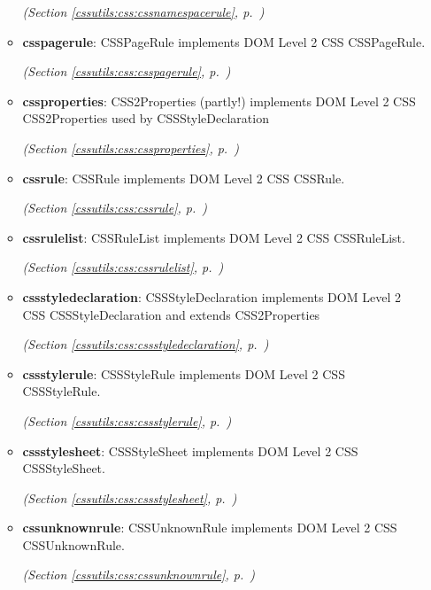 \begin{itemize}
\begin{itemize}
  \textit{(Section \ref{cssutils:css:cssnamespacerule}, p.~\pageref{cssutils:css:cssnamespacerule})}

    \item \textbf{csspagerule}: 
CSSPageRule implements DOM Level 2 CSS CSSPageRule.


  \textit{(Section \ref{cssutils:css:csspagerule}, p.~\pageref{cssutils:css:csspagerule})}

    \item \textbf{cssproperties}: 
CSS2Properties (partly!) implements DOM Level 2 CSS CSS2Properties used
by CSSStyleDeclaration


  \textit{(Section \ref{cssutils:css:cssproperties}, p.~\pageref{cssutils:css:cssproperties})}

    \item \textbf{cssrule}: 
CSSRule implements DOM Level 2 CSS CSSRule.


  \textit{(Section \ref{cssutils:css:cssrule}, p.~\pageref{cssutils:css:cssrule})}

    \item \textbf{cssrulelist}: 
CSSRuleList implements DOM Level 2 CSS CSSRuleList.


  \textit{(Section \ref{cssutils:css:cssrulelist}, p.~\pageref{cssutils:css:cssrulelist})}

    \item \textbf{cssstyledeclaration}: 
CSSStyleDeclaration implements DOM Level 2 CSS CSSStyleDeclaration and
extends CSS2Properties


  \textit{(Section \ref{cssutils:css:cssstyledeclaration}, p.~\pageref{cssutils:css:cssstyledeclaration})}

    \item \textbf{cssstylerule}: 
CSSStyleRule implements DOM Level 2 CSS CSSStyleRule.


  \textit{(Section \ref{cssutils:css:cssstylerule}, p.~\pageref{cssutils:css:cssstylerule})}

    \item \textbf{cssstylesheet}: 
CSSStyleSheet implements DOM Level 2 CSS CSSStyleSheet.


  \textit{(Section \ref{cssutils:css:cssstylesheet}, p.~\pageref{cssutils:css:cssstylesheet})}

    \item \textbf{cssunknownrule}: 
CSSUnknownRule implements DOM Level 2 CSS CSSUnknownRule.


  \textit{(Section \ref{cssutils:css:cssunknownrule}, p.~\pageref{cssutils:css:cssunknownrule})}


\end{itemize}
\end{itemize}

